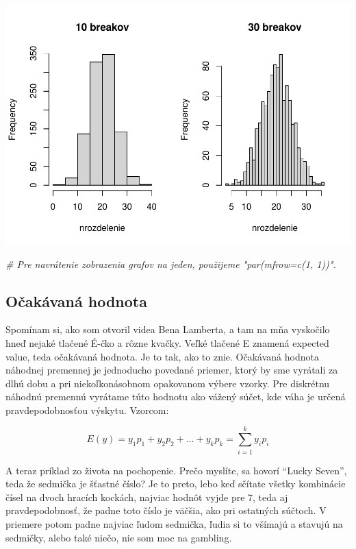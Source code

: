 \documentclass[]{article}
\newenvironment{Shaded}{\begin{snugshade}}{\end{snugshade}}
\newcommand{\CommentTok}[1]{\textcolor[rgb]{0.56,0.35,0.01}{\textit{#1}}}
\begin{document}
\includegraphics{test_files/figure-latex/unnamed-chunk-44-1.pdf}

\begin{Shaded}
\begin{Highlighting}[]
\CommentTok{# Pre navrátenie zobrazenia grafov na jeden, použijeme "par(mfrow=c(1, 1))".}
\end{Highlighting}
\end{Shaded}

\hypertarget{oux10dakuxe1vanuxe1-hodnota}{%
\subsection{Očakávaná hodnota}\label{oux10dakuxe1vanuxe1-hodnota}}

Spomínam si, ako som otvoril videa Bena Lamberta, a tam na mňa vyskočilo
hneď nejaké tlačené É-čko a rôzne kvačky. Veľké tlačené E znamená
expected value, teda očakávaná hodnota. Je to tak, ako to znie.
Očakávaná hodnota náhodnej premennej je jednoducho povedané priemer,
ktorý by sme vyrátali za dlhú dobu a pri niekoľkonásobnom opakovanom
výbere vzorky. Pre diskrétnu náhodnú premennú vyrátame túto hodnotu ako
vážený súčet, kde váha je určená pravdepodobnosťou výskytu. Vzorcom:

\[E(y)= y_1p_1 + y_2p_2 + ... + y_kp_k = \sum_{i=1}^{k}y_ip_i\]

A teraz príklad zo života na pochopenie. Prečo myslíte, sa hovorí
``Lucky Seven'', teda že sedmička je šťastné číslo? Je to preto, lebo
keď sčítate všetky kombinácie čísel na dvoch hracích kockách, najviac
hodnôt vyjde pre 7, teda aj pravdepodobnosť, že padne toto číslo je
väčšia, ako pri ostatných súčtoch. V priemere potom padne najviac ľudom
sedmička, ľudia si to všímajú a stavujú na sedmičky, alebo také niečo,
nie som moc na gambling.
\end{document}
